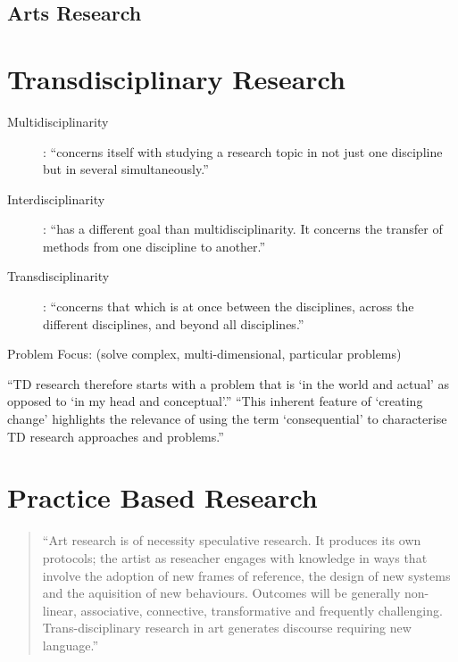 \subsection{Arts Research}

\section{Transdisciplinary Research}

\begin{description}
  \item [Multidisciplinarity]:	``concerns itself with studying a research topic in not just one discipline but in several simultaneously.''
  \item [Interdisciplinarity]:	``has a different goal than multidisciplinarity. It concerns the transfer of methods from one discipline to another.''
  \item [Transdisciplinarity]:	``concerns that which is at once between the disciplines, across the different disciplines, and beyond all disciplines.''
\end{description} \autocite{Nicolescu2010}

Problem Focus: (solve complex, multi-dimensional, particular problems)

``TD research therefore starts with a problem that is `in the world and actual' as opposed to `in my head and conceptual'.'' ``This inherent feature of `creating change' highlights the relevance of using the term `consequential' to characterise TD research approaches and problems.'' \autocite{Wickson2006}



\section{Practice Based Research}


\begin{quote}
  ``Art research is of necessity speculative research. It produces its own protocols; the artist as reseacher engages with knowledge in ways that involve the adoption of new frames of reference, the design of new systems and the aquisition of new behaviours. Outcomes will be generally non-linear, associative, connective, transformative and frequently challenging. Trans-disciplinary research in art generates discourse requiring new language.''\autocite[Roy Ascott's preface in][p. v]{Candy2011}
\end{quote}

